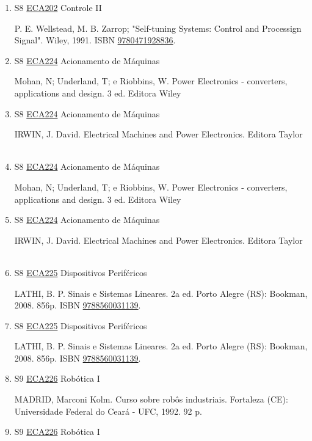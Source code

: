 \documentclass[12pt,a4paper]{book}
\begin{document}
\begin{enumerate}
 
 
 \item S8 \hyperref[PUD:ECA202]{ECA202} Controle II

  P.  E.  Wellstead, M.  B.  Zarrop;  "Self-tuning Systems: Control and Processign Signal".  Wiley, 1991.  ISBN \href{http://www.isbnsearch.org/isbn/9780471928836}{9780471928836}.
 \item S8 \hyperref[PUD:ECA224]{ECA224} Acionamento de Máquinas

  Mohan, N;  Underland, T;   e Riobbins, W.  Power Electronics - converters, applications and design.  3 ed.  Editora Wiley \
 \item S8 \hyperref[PUD:ECA224]{ECA224} Acionamento de Máquinas

 IRWIN, J.  David.  Electrical Machines and Power Electronics.  Editora Taylor \
 \item S8 \hyperref[PUD:ECA224]{ECA224} Acionamento de Máquinas

  Mohan, N;  Underland, T;   e Riobbins, W.  Power Electronics - converters, applications and design.  3 ed.  Editora Wiley \
 \item S8 \hyperref[PUD:ECA224]{ECA224} Acionamento de Máquinas

 IRWIN, J.  David.  Electrical Machines and Power Electronics.  Editora Taylor \
 \item S8 \hyperref[PUD:ECA225]{ECA225} Dispositivos Periféricos

 LATHI, B.  P.  Sinais e Sistemas Lineares.  2a ed.  Porto Alegre (RS): Bookman, 2008.  856p.  ISBN \href{http://www.bn.br/site/pages/servicosProfissionais/agenciaISBN/isbnBusca/FbnBuscaISBNCatalogo.asp?pField=ISBN&pIntPagina=1&pISBN=60031139&nidbISBN=true&hidbISBN=true}{9788560031139}.
 \item S8 \hyperref[PUD:ECA225]{ECA225} Dispositivos Periféricos

 LATHI, B.  P.  Sinais e Sistemas Lineares.  2a ed.  Porto Alegre (RS): Bookman, 2008.  856p.  ISBN \href{http://www.bn.br/site/pages/servicosProfissionais/agenciaISBN/isbnBusca/FbnBuscaISBNCatalogo.asp?pField=ISBN&pIntPagina=1&pISBN=60031139&nidbISBN=true&hidbISBN=true}{9788560031139}.
 \item S9 \hyperref[PUD:ECA226]{ECA226} Robótica I

 MADRID, Marconi Kolm.  Curso sobre robôs industriais.  Fortaleza (CE): Universidade Federal do Ceará - UFC, 1992.  92 p. 
 
 
 \item S9 \hyperref[PUD:ECA226]{ECA226} Robótica I


\end{enumerate}
\end{document}
